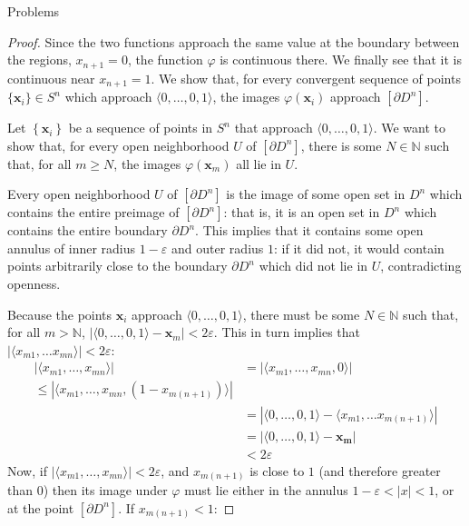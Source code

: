 \documentclass[12pt]{article}
\newcommand{\N}{\mathbb{N}}
\theoremstyle{definition}
\newenvironment{problem}[2][Problem]{\begin{trivlist}
\item[\hskip \labelsep {\bfseries #1}\hskip \labelsep {\bfseries #2.}]}{\end{trivlist}}
\begin{document}
\begin{section}{Problems}
\begin{problem}{1}
\begin{proof}
			Since the two functions approach the same value at the boundary between the regions, $x_{n+1} = 0$, the function $\varphi$ is continuous there. We finally see that it is continuous near $x_{n+1} = 1$. We show that, for every convergent sequence of points $\{\mathbf{x}_i\} \in S^{n} $ which approach $\langle 0, \dots , 0, 1\rangle$, the images $\varphi(\mathbf{x}_i) $ approach $[\partial D^n]$.
			\par Let $\left\{ \mathbf{x}_i \right\}$ be a sequence of points in $S^n$ that approach $\langle 0, \dots, 0, 1\rangle$. We want to show that, for every open neighborhood $U$ of $[\partial D^n]$, there is some $N \in \N$ such that, for all $m \geq N$, the images $\varphi(\mathbf{x}_m)$ all lie in $U$.
			\par Every open neighborhood $U$ of $[\partial D^n]$ is the image of some open set in $D^n$ which contains the entire preimage of $[\partial D^n]$: that is, it is an open set in $D^n$ which contains the entire boundary $\partial D^n$. This implies that it contains some open annulus of inner radius $1 - \varepsilon$ and outer radius $1$: if it did not, it would contain points arbitrarily close to the boundary $\partial D^n$ which did not lie in $U$, contradicting openness. 
			\par Because the points $\mathbf{x}_i$ approach $\langle 0, \dots , 0,1\rangle$, there must be some $N \in \N$ such that, for all $m > \N$, $\left \lvert { \langle 0, \dots , 0, 1\rangle - \mathbf{x}_m } \right \lvert  < 2\varepsilon$. This in turn implies that $\lvert\langle x_{m1}, \dots x_{mn}\rangle \rvert < 2\varepsilon$:
			\begin{align*}
				\left \lvert { \langle x_{m1}, \dots , x_{mn}\rangle} \right \lvert &= \left \lvert { \langle x_{m1}, \dots , x_{mn}, 0\rangle } \right \lvert \\
				\leq \left \lvert { \langle x_{m1}, \dots , x_{mn}, (1 - x_{m(n+1)})\rangle } \right \lvert \\
				&= \left \lvert { \langle 0, \dots , 0 , 1\rangle - \langle x_{m1}, \dots x_{m(n+1)}\rangle } \right \lvert \\
				&= \left \lvert { \langle 0, \dots , 0, 1\rangle - \mathbf{x_m }} \right \lvert \\
				&< 2\varepsilon
			\end{align*}
			Now, if $\left \lvert { \langle x_{m1}, \dots , x_{mn}\rangle } \right \lvert < 2\varepsilon$, and $x_{m(n+1)}$ is close to $1$ (and therefore greater than 0) then its image under $\varphi$ must lie either in the annulus $1 - \varepsilon < \left \lvert { x } \right \lvert  < 1$, or at the point $[\partial D^n]$. If $x_{m(n+1)} < 1$:

\end{proof}
\end{problem}
\end{section}
\end{document}
